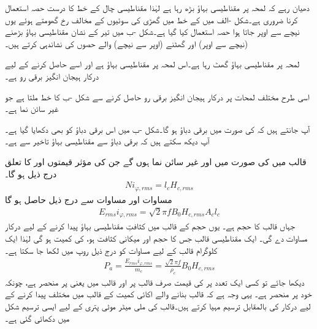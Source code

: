 دھیان رہے کہ لمحہ  پر مقناطیسی بہاؤ بڑھ رہا ہے لہٰذا مقناطیسی چال کے خط کا درست حصہ استعمال کرنا ضروری ہے۔شکل -الف میں    کے خط میں گھڑی کی سوئیوں کے مخالف رخ گھومتے ہوئے یوں نیچے سے اوپر جاتا ہوا حصہ استعمال کیا گیا ہے۔شکل -ب میں  تیر کے نشان  مقناطیسی بہاؤ بڑھنے (نیچے سے اوپر) اور گھٹنے (اوپر سے نیچے) والے حصوں کی نشاندہی کرتے ہیں۔


 لمحہ  پر مقناطیسی بہاؤ گھٹ رہا ہے۔اس لمحہ پر مقناطیسی بہاؤ  ہے اور اسے حاصل کرنے کے لیے درکار ہیجان انگیز برقی رو  ہے۔

اسی طرح مختلف لمحات پر درکار ہیجان انگیز برقی رو حاصل کرنے سے شکل -ب کا      خط ملتا ہے جو  غیر سائن نما ہے۔

آپ جانتے ہیں کہ   کی صورت میں برقی دباؤ  ہو گا۔شکل -ب میں اس برقی دباؤ کو بھی دکھایا گیا ہے۔آپ دیکھ سکتے ہیں کہ برقی دباؤ سے  مقناطیسی بہاؤ  تاخیر سے ہے۔

قالب میں   کی صورت میں   اور   غیر سائن نما ہوں گے جن  کی مؤثر قیمتوں  اور   کا تعلق درج ذیل ہو گا۔
\begin{align}\label{مساوات_مقناطیسی_دور_دباو_برابر_شدت_ضرب_لمبائی}
N i_{\varphi,rms}=l_c H_{c,rms}
\end{align}
مساوات    اور مساوات   سے درج ذیل حاصل ہو گا
\begin{align}\label{مساوات_مقناطیسی_دور_درکار_دباو_ضرب_رو}
E_{rms} i_{\varphi,rms}=\sqrt{2} \pi f B_0 H_{c,rms} A_c l_c
\end{align}
جہاں   قالب کا حجم ہے۔ یوں    حجم کے قالب  میں   کثافتِ مقناطیسی بہاؤ پیدا کرنے کے لیے درکار  مساوات   دے گی۔ ایک مقناطیسی قالب جس کا حجم   اور  میکانی کثافت   ہو، کی کمیت  ہو گی لہٰذا  ایک کلوگرام  قالب کے لیے مساوات  کو  درج ذیل روپ میں لکھا جا سکتا ہے۔
\begin{align}
P_a=\frac{E_{rms} i_{\varphi,rms}}{m_c}=\frac{\sqrt{2} \pi f}{\rho_c} B_0 H_{c,rms}
\end{align}
دیکھا جائے تو کسی ایک تعدد   پر  کی قیمت صرف قالب پر اور قالب میں  یعنی  پر منحصر ہے، چونکہ  خود  پر منحصر ہے۔ یہی وجہ ہے کہ  قالب بنانے والے اکائی کمیت کے قالب میں مختلف  پیدا کرنے کے لیے درکار  کی  بالمقابل  ترسیم مہیا کرتے ہیں۔قالب کی  ملی میٹر موٹی پتری کے لیے ایسی ترسیم  شکل  میں دکھائی گئی ہے۔
